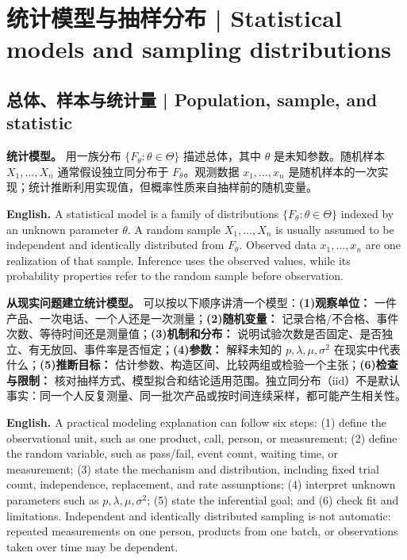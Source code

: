 \documentclass[UTF8,11pt,a4paper]{ctexart}
\newcommand{\EN}[1]{\par\noindent\textbf{English.} #1\par}
\begin{document}
\section{统计模型与抽样分布 | Statistical models and sampling distributions}
\subsection{总体、样本与统计量 | Population, sample, and statistic}
\noindent\textbf{统计模型。} 用一族分布 $\{F_\theta:\theta\in\Theta\}$ 描述总体，其中 $\theta$ 是未知参数。随机样本 $X_1,\ldots,X_n$ 通常假设独立同分布于 $F_\theta$。观测数据 $x_1,\ldots,x_n$ 是随机样本的一次实现；统计推断利用实现值，但概率性质来自抽样前的随机变量。

\EN{A statistical model is a family of distributions $\{F_\theta:\theta\in\Theta\}$ indexed by an unknown parameter $\theta$. A random sample $X_1,\ldots,X_n$ is usually assumed to be independent and identically distributed from $F_\theta$. Observed data $x_1,\ldots,x_n$ are one realization of that sample. Inference uses the observed values, while its probability properties refer to the random sample before observation.}

\noindent\textbf{从现实问题建立统计模型。} 可以按以下顺序讲清一个模型：\textbf{(1)观察单位：} 一件产品、一次电话、一个人还是一次测量；\textbf{(2)随机变量：} 记录合格/不合格、事件次数、等待时间还是测量值；\textbf{(3)机制和分布：} 说明试验次数是否固定、是否独立、有无放回、事件率是否恒定；\textbf{(4)参数：} 解释未知的 $p,\lambda,\mu,\sigma^2$ 在现实中代表什么；\textbf{(5)推断目标：} 估计参数、构造区间、比较两组或检验一个主张；\textbf{(6)检查与限制：} 核对抽样方式、模型拟合和结论适用范围。独立同分布（iid）不是默认事实：同一个人反复测量、同一批次产品或按时间连续采样，都可能产生相关性。
\EN{A practical modeling explanation can follow six steps: (1) define the observational unit, such as one product, call, person, or measurement; (2) define the random variable, such as pass/fail, event count, waiting time, or measurement; (3) state the mechanism and distribution, including fixed trial count, independence, replacement, and rate assumptions; (4) interpret unknown parameters such as $p,\lambda,\mu,\sigma^2$; (5) state the inferential goal; and (6) check fit and limitations. Independent and identically distributed sampling is not automatic: repeated measurements on one person, products from one batch, or observations taken over time may be dependent.}
\end{document}
